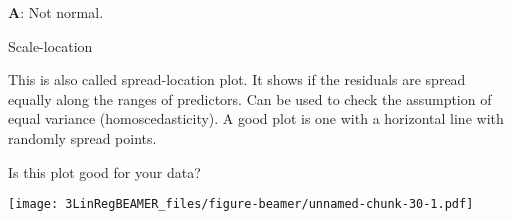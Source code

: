\documentclass[ignorenonframetext,]{beamer}
\newenvironment{Shaded}{\begin{snugshade}}{\end{snugshade}}
\newcommand{\KeywordTok}[1]{\textcolor[rgb]{0.13,0.29,0.53}{\textbf{#1}}}
\newcommand{\DataTypeTok}[1]{\textcolor[rgb]{0.13,0.29,0.53}{#1}}
\newcommand{\FloatTok}[1]{\textcolor[rgb]{0.00,0.00,0.81}{#1}}
\newcommand{\StringTok}[1]{\textcolor[rgb]{0.31,0.60,0.02}{#1}}
\newcommand{\OtherTok}[1]{\textcolor[rgb]{0.56,0.35,0.01}{#1}}
\newcommand{\OperatorTok}[1]{\textcolor[rgb]{0.81,0.36,0.00}{\textbf{#1}}}
\newcommand{\NormalTok}[1]{#1}
\begin{document}
\begin{frame}

\textbf{A}: Not normal.

\end{frame}

\begin{frame}

\begin{block}{Scale-location}

This is also called spread-location plot. It shows if the residuals are
spread equally along the ranges of predictors. Can be used to check the
assumption of equal variance (homoscedasticity). A good plot is one with
a horizontal line with randomly spread points.

Is this plot good for your data?

\end{block}

\end{frame}

\begin{frame}[fragile]

\footnotesize

\begin{Shaded}
\end{Shaded}

\texttt{[image: 3LinRegBEAMER\_files/figure-beamer/unnamed-chunk-30-1.pdf]}
\normalsize

\end{frame}
\end{document}
